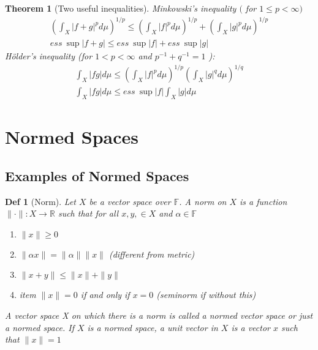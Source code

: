 \documentclass[10pt]{paper}
\newtheorem{theorem}{Theorem}[section]
\newtheorem{definition}{Def}[section]
\begin{document}
\begin{theorem}[Two useful inequalities]
    Minkowski's inequality $($ for $1 \leq p<\infty)$
    $$
        \begin{array}{c}
            \left(\int_{X}|f+g|^{p} d \mu\right)^{1 / p} \leq\left(\int_{X}|f|^{p} d \mu\right)^{1 / p}+\left(\int_{X}|g|^{p} d \mu\right)^{1 / p} \\
            ess\  \sup |f+g| \leq ess\  \sup |f|+ess\  \sup |g|
        \end{array}
    $$
    Hölder's inequality (for $1<p<\infty$ and $p^{-1}+q^{-1}=1$ ):
    $$
        \begin{array}{l}
            \int_{X}|f g| d \mu \leq\left(\int_{X}|f|^{p} d \mu\right)^{1 / p}\left(\int_{X}|g|^{q} d \mu\right)^{1 / q} \\
            \int_{X}|f g| d \mu \leq ess\  \sup |f| \int_{X}|g| d \mu
        \end{array}
    $$
\end{theorem}






\section{Normed Spaces}
\subsection{Examples of Normed Spaces}
\begin{definition}[Norm]
    Let $X$ be a vector space over $\mathbb{F}$. A norm on $X$ is a function $\|\cdot\|: X \rightarrow \mathbb{R}$ such that for all $x, y, \in X$ and $\alpha \in \mathbb{F}$
    \begin{enumerate}
        \item $\|x\| \geq 0$
        \item $\|\alpha x\|=\|\alpha\|\|x\|$ (different from metric)
        \item $\|x+y\| \leq\|x\|+\|y\|$ 
        \item item $\|x\|=0$ if and only if $x=0$ (seminorm if without this)
    \end{enumerate}
    A vector space X on which there is a norm is called a normed vector space or just a normed space. If $X$ is a normed space, a unit vector in $X$ is a vector $x$ such that $\|x\|=1$
\end{definition}
\end{document}
